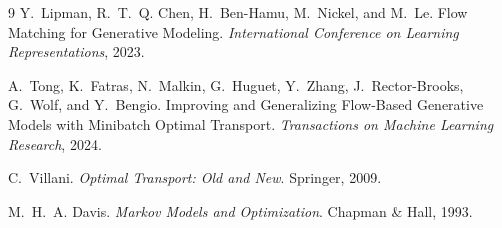 \documentclass[11pt]{article}
\newcommand{\1}{\mathbf{1}}
\begin{document}
\begin{thebibliography}{9}
\small
{}
Y.~Lipman, R.~T.~Q. Chen, H.~Ben-Hamu, M.~Nickel, and M.~Le.
\newblock Flow Matching for Generative Modeling.
\newblock \emph{International Conference on Learning Representations}, 2023.

A.~Tong, K.~Fatras, N.~Malkin, G.~Huguet, Y.~Zhang, J.~Rector-Brooks,
G.~Wolf, and Y.~Bengio.
\newblock Improving and Generalizing Flow-Based Generative Models with
Minibatch Optimal Transport.
\newblock \emph{Transactions on Machine Learning Research}, 2024.

C.~Villani.
\newblock \emph{Optimal Transport: Old and New}.
\newblock Springer, 2009.

M.~H.~A. Davis.
\newblock \emph{Markov Models and Optimization}.
\newblock Chapman \& Hall, 1993.
\end{thebibliography}
\end{document}
